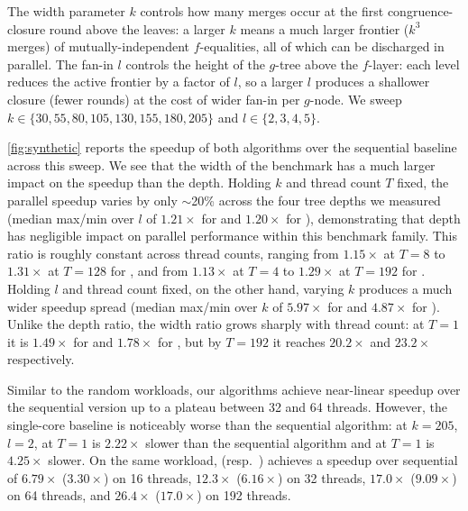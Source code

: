 The width parameter $k$ controls how many merges occur at the first congruence-closure
round above the leaves: a larger $k$ means a much larger frontier ($k^3$
merges) of mutually-independent $f$-equalities, all of which can be discharged
in parallel. The fan-in $l$ controls the height of the $g$-tree above the
$f$-layer: each level reduces the active frontier by a factor of $l$, so a
larger $l$ produces a shallower closure (fewer rounds) at the cost of wider
fan-in per $g$-node. We sweep $k \in \{30, 55, 80, 105, 130, 155, 180, 205\}$
and $l \in \{2, 3, 4, 5\}$.

\autoref{fig:synthetic} reports the speedup of both algorithms over the
sequential baseline across this sweep.
We see that the width of the benchmark has a much larger impact on the speedup
than the depth. Holding $k$ and thread count $T$ fixed, the parallel
speedup varies by only $\sim$20\% across the four tree depths we measured
(median max/min over $l$ of $1.21\times$ for \filteralgo and $1.20\times$ for
\parentalgo), demonstrating that depth has negligible impact on parallel
performance within this benchmark family. This ratio is roughly constant across thread counts, ranging from
$1.15\times$ at $T{=}8$ to $1.31\times$ at $T{=}128$ for \filteralgo, and from
$1.13\times$ at $T{=}4$ to $1.29\times$ at $T{=}192$ for \parentalgo. Holding
$l$ and thread count fixed, on the other hand, varying $k$ produces a much wider
speedup spread (median max/min over $k$ of $5.97\times$ for \filteralgo and
$4.87\times$ for \parentalgo). Unlike the depth ratio, the width ratio grows
sharply with thread count: at $T{=}1$ it is $1.49\times$ for \filteralgo and
$1.78\times$ for \parentalgo, but by $T{=}192$ it reaches $20.2\times$ and
$23.2\times$ respectively.

Similar to the random workloads, our algorithms achieve near-linear speedup
over the sequential version up to a plateau between 32 and 64 threads.
However, the single-core baseline is noticeably worse than the sequential
algorithm: at $k{=}205$, $l{=}2$, \filteralgo at $T{=}1$ is $2.22\times$
slower than the sequential algorithm and \parentalgo at $T{=}1$ is
$4.25\times$ slower. On the same workload, \filteralgo (resp.\ \parentalgo)
achieves a speedup over sequential of $6.79\times$ ($3.30\times$) on 16
threads, $12.3\times$ ($6.16\times$) on 32 threads, $17.0\times$
($9.09\times$) on 64 threads, and $26.4\times$ ($17.0\times$) on 192
threads.




